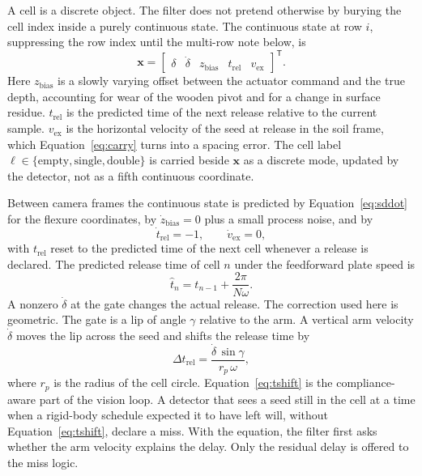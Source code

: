 A cell is a discrete object. The filter does not pretend otherwise by burying the cell index inside a purely continuous state. The continuous state at row \(i\), suppressing the row index until the multi-row note below, is
\begin{equation}
\label{eq:state}
\mathbf{x} =
\begin{bmatrix}
\delta & \dot{\delta} & z_{\mathrm{bias}} & t_{\mathrm{rel}} & v_{\mathrm{ex}}
\end{bmatrix}^{\mathsf{T}}.
\end{equation}
Here \(z_{\mathrm{bias}}\) is a slowly varying offset between the actuator command and the true depth, accounting for wear of the wooden pivot and for a change in surface residue. \(t_{\mathrm{rel}}\) is the predicted time of the next release relative to the current sample. \(v_{\mathrm{ex}}\) is the horizontal velocity of the seed at release in the soil frame, which Equation~\eqref{eq:carry} turns into a spacing error. The cell label \(\ell\in\{\mathrm{empty},\mathrm{single},\mathrm{double}\}\) is carried beside \(\mathbf{x}\) as a discrete mode, updated by the detector, not as a fifth continuous coordinate.

Between camera frames the continuous state is predicted by Equation~\eqref{eq:sddot} for the flexure coordinates, by \(\dot{z}_{\mathrm{bias}}=0\) plus a small process noise, and by
\begin{equation}
\label{eq:trel}
\dot{t}_{\mathrm{rel}} = -1,\qquad
\dot{v}_{\mathrm{ex}} = 0,
\end{equation}
with \(t_{\mathrm{rel}}\) reset to the predicted time of the next cell whenever a release is declared. The predicted release time of cell \(n\) under the feedforward plate speed is
\begin{equation}
\label{eq:tn}
\hat{t}_n = t_{n-1} + \frac{2\pi}{N\omega}.
\end{equation}
A nonzero \(\dot{\delta}\) at the gate changes the actual release. The correction used here is geometric. The gate is a lip of angle \(\gamma\) relative to the arm. A vertical arm velocity \(\dot{\delta}\) moves the lip across the seed and shifts the release time by
\begin{equation}
\label{eq:tshift}
\Delta t_{\mathrm{rel}} = \frac{\dot{\delta}\,\sin\gamma}{r_p\,\omega},
\end{equation}
where \(r_p\) is the radius of the cell circle. Equation~\eqref{eq:tshift} is the compliance-aware part of the vision loop. A detector that sees a seed still in the cell at a time when a rigid-body schedule expected it to have left will, without Equation~\eqref{eq:tshift}, declare a miss. With the equation, the filter first asks whether the arm velocity explains the delay. Only the residual delay is offered to the miss logic.

